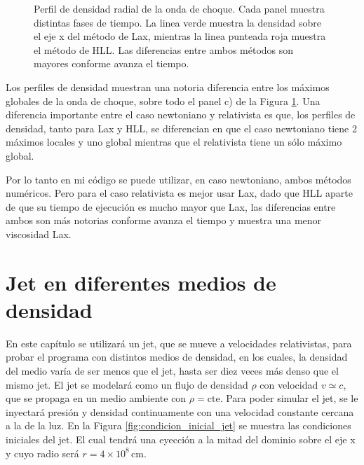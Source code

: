 \documentclass[12pt,a4paper]{book}
\begin{document}
\begin{figure}
\caption{\label{fig:perfil_de_densidad_radial_relativista}Perfil de densidad radial de la onda de choque. Cada panel muestra distintas fases de tiempo. La linea verde muestra la densidad sobre el eje x del método de Lax, mientras la linea punteada roja muestra el método de HLL. Las diferencias entre ambos métodos son mayores conforme avanza el tiempo.}
\end{figure}

Los perfiles de densidad muestran una notoria diferencia entre los máximos globales de la onda de choque, sobre todo el panel c) de la Figura \ref{fig:perfil_de_densidad_radial_relativista}. Una diferencia importante entre el caso newtoniano y relativista es que, los perfiles de densidad, tanto para Lax y HLL, se diferencian en que el caso newtoniano tiene 2 máximos locales y uno global mientras que el relativista tiene un sólo máximo global.

Por lo tanto en mi código se puede utilizar, en caso newtoniano, ambos métodos numéricos. Pero para el caso relativista es mejor usar Lax, dado que HLL aparte de que su tiempo de ejecución es mucho mayor que Lax, las diferencias entre ambos son más notorias conforme avanza el tiempo y muestra una menor viscosidad Lax. 




\chapter{Jet en diferentes medios de densidad}

En este capítulo se utilizará un jet, que se mueve a velocidades relativistas, para probar el programa con distintos medios de densidad, en los cuales, la densidad del medio varía de ser menos que el jet, hasta ser diez veces más denso que el mismo jet.
El jet  se modelará como un flujo de densidad $\rho$ con velocidad $v \simeq c$, que se propaga en un medio ambiente con $\rho = \mathrm{cte}$. Para poder simular el jet, se le inyectará presión y densidad continuamente con una velocidad constante cercana a la de la luz. En la Figura \ref{fig:condicion_inicial_jet} se muestra las condiciones iniciales del jet. El cual tendrá una eyección a la mitad del dominio sobre el eje x y cuyo radio será $r = 4 \times 10^{8} \, \mathrm{cm}$.
\end{document}
